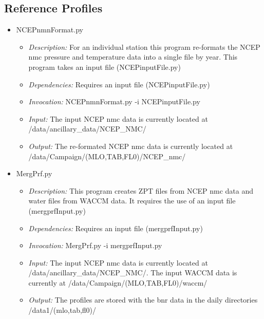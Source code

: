 \documentclass[12pt, letterpaper]{article}
\begin{document}
\subsection{Reference Profiles}
\begin{itemize}
\item NCEPnmnFormat.py
\begin{itemize}
\item \textit{Description:} For an individual station this program re-formats the NCEP nmc pressure and temperature data into a single file by year. This program takes an input file (NCEPinputFile.py)
\item \textit{Dependencies:} Requires an input file (NCEPinputFile.py)
\item \textit{Invocation:} NCEPnmnFormat.py -i NCEPinputFile.py
\item \textit{Input:} The input NCEP nmc data is currently located at /data/ancillary\_data/NCEP\_NMC/
\item \textit{Output:} The re-formated NCEP nmc data is currently located at /data/Campaign/(MLO,TAB,FL0)/NCEP\_nmc/
\end{itemize}
\end{itemize}

\begin{itemize}
\item MergPrf.py
\begin{itemize}
\item \textit{Description:} This program creates ZPT files from NCEP nmc data and water files from WACCM data. It requires the use of an input file (mergprfInput.py)
\item \textit{Dependencies:} Requires an input file (mergprfInput.py)
\item \textit{Invocation:} MergPrf.py -i mergprfInput.py
\item \textit{Input:} The input NCEP nmc data is currently located at /data/ancillary\_data/NCEP\_NMC/. The input WACCM data is currently at /data/Campaign/(MLO,TAB,FL0)/waccm/
\item \textit{Output:} The profiles are stored with the bnr data in the daily directories /data1/(mlo,tab,fl0)/
\end{itemize}
\end{itemize}
\end{document}
